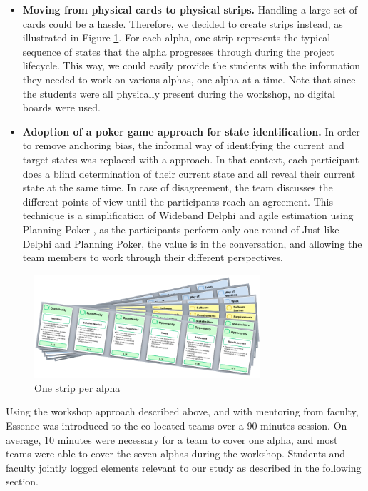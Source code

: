 \begin{itemize}
    \item \textbf{Moving from physical cards to physical strips.} Handling a large set of cards could be a hassle. Therefore, we decided to create strips instead, as illustrated in Figure \ref{OneAlphaStrip}. For each alpha, one strip represents the typical sequence of states that the alpha progresses through during the project lifecycle. This way, we could easily provide the students with the information they needed to work on various alphas, one alpha at a time. Note that since the students were all physically present during the workshop, no digital boards were used.
    
    \item \textbf{Adoption of a poker game approach for state identification.} In order to remove anchoring bias, the informal way of identifying the current and target states was replaced with a  approach. In that context, each participant does a blind determination of their current state and all reveal their current state at the same time. In case of disagreement, the team discusses the different points of view until the participants reach an agreement. This technique is a simplification of Wideband Delphi \cite{StellmanAppliedPM} and agile estimation using Planning Poker \cite{GrenningPlanningPoker}, as the participants perform only one round of  Just like Delphi and Planning Poker, the value is in the conversation, and allowing the team members to work through their different perspectives.
\end{itemize}

\begin{figure}[h]
\centering
\includegraphics[width=3.30in]{project_steering_images/OneAlphaStrip.png}
\caption{One strip per alpha}
\label{OneAlphaStrip}
\end{figure}

Using the workshop approach described above, and with mentoring from faculty, Essence was introduced to the co-located teams over a 90 minutes session. On average, 10 minutes were necessary for a team to cover one alpha, and most teams were able to cover the seven alphas during the workshop. Students and faculty jointly logged elements relevant to our study as described in the following section.

